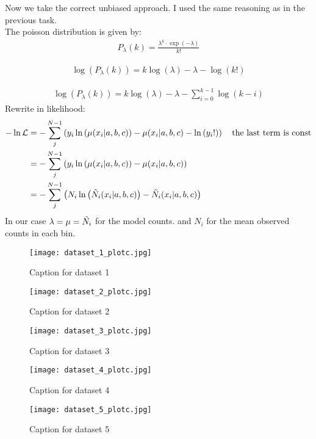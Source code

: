 Now we take the correct unbiased approach. I used the same reasoning as in the previous task.\\
The poisson distribution is given by:
\begin{align}
    P_\lambda (k) = \frac{\lambda^k \cdot \exp(-\lambda)}{k!}
\end{align}

\begin{align}
    \log(P_\lambda (k)) = k \log(\lambda) -\lambda -\log(k!)
\end{align}

\begin{align}
    \log(P_\lambda (k)) = k \log(\lambda) -\lambda - \sum_{i=0}^{k-1} \log(k-i)
\end{align}
Rewrite in likelihood:
\begin{align}
    - \ln \mathcal{L} &= - \sum_j^{N-1} \left({y_i \ln \left({\mu(x_i|a,b,c)}\right)-\mu(x_i|a,b,c)- \ln \left({y_i!}\right)}\right) \quad \text{the last term is const}\\
    &= - \sum_j^{N-1} \left({y_i \ln \left({\mu(x_i|a,b,c)}\right)-\mu(x_i|a,b,c)}\right)\\
    &= - \sum_j^{N-1} \left({N_i \ln \left({\Tilde{N}_i(x_i|a,b,c)}\right)-\Tilde{N}_i(x_i|a,b,c)}\right)
\end{align}
In our case $\lambda = \mu = \Tilde{N}_i$ for the model counts. and $N_i$ for the mean observed counts in each bin. 

\begin{figure}[h!]
    \centering
    \texttt{[image: dataset\_1\_plotc.jpg]}
    \caption{Caption for dataset 1}
\end{figure}

\begin{figure}[h!]
    \centering
    \texttt{[image: dataset\_2\_plotc.jpg]}
    \caption{Caption for dataset 2}
\end{figure}

\begin{figure}[h!]
    \centering
    \texttt{[image: dataset\_3\_plotc.jpg]}
    \caption{Caption for dataset 3}
\end{figure}

\begin{figure}[h!]
    \centering
    \texttt{[image: dataset\_4\_plotc.jpg]}
    \caption{Caption for dataset 4}
\end{figure}

\begin{figure}[h!]
    \centering
    \texttt{[image: dataset\_5\_plotc.jpg]}
    \caption{Caption for dataset 5}
\end{figure}










